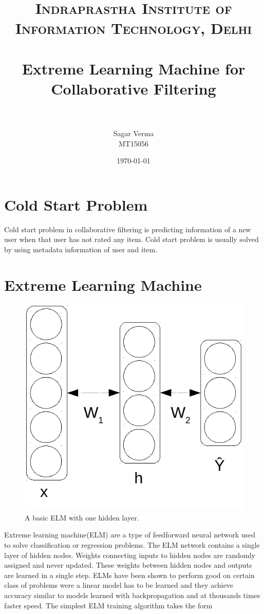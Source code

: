 \documentclass[paper=a4, fontsize=11pt]{scrartcl} %
\title{ 
\normalfont \normalsize 
\textsc{Indraprastha Institute of Information Technology, Delhi} \\ [1pt] %
\horrule{0.1pt} \\[0.2cm] %
\huge Extreme Learning Machine for Collaborative Filtering \\ %
\horrule{0.2pt} \\[0.2cm] %
}
\author{Sagar Verma \\ MT15056} %
\date{\normalsize\today} %
\numberwithin{equation}{section} %
\numberwithin{figure}{section} %
\numberwithin{table}{section} %
\begin{document}
\maketitle %


\section{Cold Start Problem}


\par
Cold start problem in collaborative filtering is predicting information of a new user when that user has not rated any item. Cold start problem is usually solved by using metadata information of user and item.

\section{Extreme Learning Machine}

\begin{figure}[H]
\centering
    \includegraphics[width=0.35\linewidth]{ELM}
    \caption{A basic ELM with one hidden layer.}
\end{figure}

\par
Extreme learning machine(ELM) are a type of feedforward neural network used to solve classification or regression problems. The ELM network contains a single layer of hidden nodes. Weights connecting inputs to hidden nodes are randomly assigned and never updated. These weights between hidden nodes and outputs are learned in a single step. ELMs have been shown to perform good on certain class of problems were a linear model has to be learned and they achieve accuracy similar to models learned with backpropagation and at thousands times faster speed. The simplest ELM training algorithm takes the form
\end{document}
